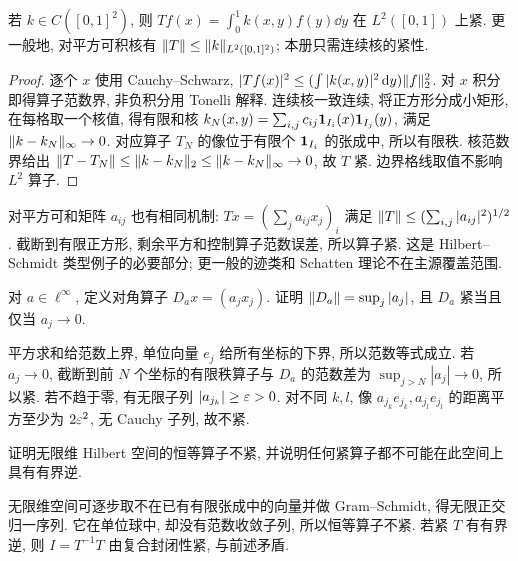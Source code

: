 \begin{theorem}\label{thm:continuouskernelcompact}
若 $k\in C([0,1]^2)$, 则 $Tf(x)=\int_0^1k(x,y)f(y)\dd y$ 在 $L^2([0,1])$ 上紧. 更一般地, 对平方可积核有 $\lVert T\rVert\le\lVert k\rVert_{L^2([0,1]^2)}$; 本册只需连续核的紧性.
\end{theorem}
\begin{proof}
逐个 $x$ 使用 Cauchy--Schwarz,
$|Tf(x)|^2\le(\int|k(x,y)|^2\,\mathrm d y)\lVert f\rVert_2^2$.
对 $x$ 积分即得算子范数界, 非负积分用 Tonelli 解释. 连续核一致连续, 将正方形分成小矩形, 在每格取一个核值, 得有限和核 $k_N(x,y)=\sum_{i,j}c_{ij}\mathbf 1_{I_i}(x)\mathbf 1_{I_j}(y)$, 满足 $\lVert k-k_N\rVert_\infty\to0$. 对应算子 $T_N$ 的像位于有限个 $\mathbf 1_{I_i}$ 的张成中, 所以有限秩. 核范数界给出 $\lVert T-T_N\rVert\le\lVert k-k_N\rVert_2\le\lVert k-k_N\rVert_\infty\to0$, 故 $T$ 紧. 边界格线取值不影响 $L^2$ 算子.
\end{proof}
对平方可和矩阵 $a_{ij}$ 也有相同机制: $Tx=(\sum_ja_{ij}x_j)_i$ 满足 $\lVert T\rVert\le(\sum_{i,j}|a_{ij}|^2)^{1/2}$. 截断到有限正方形, 剩余平方和控制算子范数误差, 所以算子紧. 这是 Hilbert--Schmidt 类型例子的必要部分; 更一般的迹类和 Schatten 理论不在主源覆盖范围.

\begin{exercise}\label{legacy:ch10:exercise1}
对 $a\in\ell^\infty$, 定义对角算子 $D_ax=(a_jx_j)$. 证明 $\lVert D_a\rVert=\sup_j|a_j|$, 且 $D_a$ 紧当且仅当 $a_j\to0$.
\end{exercise}
\begin{solution}
平方求和给范数上界, 单位向量 $e_j$ 给所有坐标的下界, 所以范数等式成立. 若 $a_j\to0$, 截断到前 $N$ 个坐标的有限秩算子与 $D_a$ 的范数差为 $\sup_{j>N}|a_j|\to0$, 所以紧. 若不趋于零, 有无限子列 $|a_{j_k}|\ge\varepsilon>0$. 对不同 $k,l$, 像 $a_{j_k}e_{j_k},a_{j_l}e_{j_l}$ 的距离平方至少为 $2\varepsilon^2$, 无 Cauchy 子列, 故不紧.
\end{solution}

\begin{exercise}\label{legacy:ch10:exercise2}
证明无限维 Hilbert 空间的恒等算子不紧, 并说明任何紧算子都不可能在此空间上具有有界逆.
\end{exercise}
\begin{solution}
无限维空间可逐步取不在已有有限张成中的向量并做 Gram--Schmidt, 得无限正交归一序列. 它在单位球中, 却没有范数收敛子列, 所以恒等算子不紧. 若紧 $T$ 有有界逆, 则 $I=T^{-1}T$ 由复合封闭性紧, 与前述矛盾.
\end{solution}
